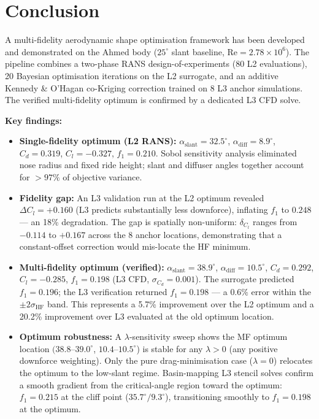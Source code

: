 \section{Conclusion}
\label{sec:conclusion}

A multi-fidelity aerodynamic shape optimisation framework has been developed and demonstrated on the Ahmed body ($25^\circ$ slant baseline, $\mathrm{Re}=2.78\times10^6$). The pipeline combines a two-phase RANS design-of-experiments (80 L2 evaluations), 20 Bayesian optimisation iterations on the L2 surrogate, and an additive Kennedy \& O'Hagan co-Kriging correction trained on 8 L3 anchor simulations. The verified multi-fidelity optimum is confirmed by a dedicated L3 CFD solve.

\textbf{Key findings:}

\begin{itemize}
    \item \textbf{Single-fidelity optimum (L2 RANS):} $\alpha_\mathrm{slant}=32.5^\circ$, $\alpha_\mathrm{diff}=8.9^\circ$, $C_d=0.319$, $C_l=-0.327$, $f_1=0.210$. Sobol sensitivity analysis eliminated nose radius and fixed ride height; slant and diffuser angles together account for $>97\%$ of objective variance.

    \item \textbf{Fidelity gap:} An L3 validation run at the L2 optimum revealed $\Delta C_l=+0.160$ (L3 predicts substantially less downforce), inflating $f_1$ to $0.248$ — an 18\% degradation. The gap is spatially non-uniform: $\delta_{C_l}$ ranges from $-0.114$ to $+0.167$ across the 8 anchor locations, demonstrating that a constant-offset correction would mis-locate the HF minimum.

    \item \textbf{Multi-fidelity optimum (verified):} $\alpha_\mathrm{slant}=38.9^\circ$, $\alpha_\mathrm{diff}=10.5^\circ$, $C_d=0.292$, $C_l=-0.285$, $f_1=0.198$ (L3 CFD, $\sigma_{C_d}=0.001$). The surrogate predicted $f_1=0.196$; the L3 verification returned $f_1=0.198$ — a $0.6\%$ error within the $\pm2\sigma_\mathrm{HF}$ band. This represents a 5.7\% improvement over the L2 optimum and a 20.2\% improvement over L3 evaluated at the old optimum location.

    \item \textbf{Optimum robustness:} A $\lambda$-sensitivity sweep shows the MF optimum location $(38.8$--$39.0^\circ$, $10.4$--$10.5^\circ$) is stable for any $\lambda>0$ (any positive downforce weighting). Only the pure drag-minimisation case ($\lambda=0$) relocates the optimum to the low-slant regime. Basin-mapping L3 stencil solves confirm a smooth gradient from the critical-angle region toward the optimum: $f_1=0.215$ at the cliff point ($35.7^\circ/9.3^\circ$), transitioning smoothly to $f_1=0.198$ at the optimum.


\end{itemize}
